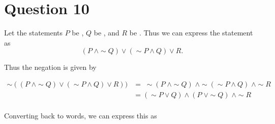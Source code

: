 \documentclass[11pt, oneside]{article}   	%
\begin{document}
\section*{Question 10}

Let the statements $P$ be , $Q$ be , and $R$ be . Thus we can express the statement  as
$$(P \; \wedge \sim Q) \vee (\sim P \wedge Q) \vee R.$$

Thus the negation is given by

\begin{align*}
\sim ((P \; \wedge \sim Q) \vee (\sim P \wedge Q) \vee R)) & = \; \sim(P \; \wedge \sim Q) \; \wedge \sim(\sim P \wedge Q) \; \wedge \sim R \\
& = (\sim P \vee Q) \wedge (P \; \vee \sim Q) \; \wedge \sim R \\
\end{align*}

Converting back to words, we can express this as 
\end{document}
